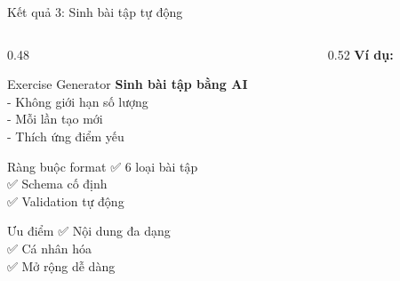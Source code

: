 \documentclass[notheorems,hyperref={bookmarks=true}]{beamer}
\begin{document}
\begin{frame}{Kết quả 3: Sinh bài tập tự động}
\begin{columns}
    \begin{column}{0.48\textwidth}
        \begin{exampleblock}{Exercise Generator}
            \textbf{Sinh bài tập bằng AI}\\
            {\footnotesize
            - Không giới hạn số lượng\\
            - Mỗi lần tạo mới\\
            - Thích ứng điểm yếu
            }
        \end{exampleblock}
        
        \vspace{0.2cm}
        
        \begin{block}{Ràng buộc format}
            {\footnotesize
            ✅ 6 loại bài tập\\
            ✅ Schema cố định\\
            ✅ Validation tự động
            }
        \end{block}
        
        \vspace{0.2cm}
        
        \begin{alertblock}{Ưu điểm}
            {\footnotesize
            ✅ Nội dung đa dạng\\
            ✅ Cá nhân hóa\\
            ✅ Mở rộng dễ dàng
            }
        \end{alertblock}
    \end{column}
    \begin{column}{0.52\textwidth}
        \centering
        \textbf{Ví dụ:}\\[0.15cm]
    \end{column}
\end{columns}
\end{frame}
\end{document}
